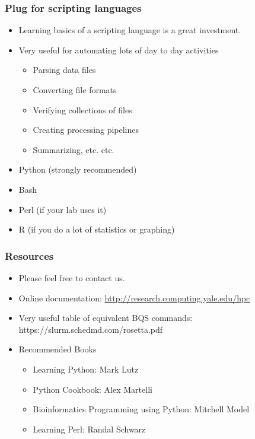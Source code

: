 \documentclass[10pt]{beamer}
\begin{document}
\begin{frame}[fragile]
\frametitle{Plug for scripting languages}

\begin{itemize}
\item Learning basics of a scripting language is a great investment.
\item Very useful for automating lots of day to day activities
\begin{itemize}
\item Parsing data files
\item Converting file formats
\item Verifying collections of files
\item Creating processing pipelines
\item Summarizing, etc. etc.
\end{itemize}
\item Python (strongly recommended)
\item Bash 
\item Perl (if your lab uses it)
\item R (if you do a lot of statistics or graphing)
\end{itemize}

\end{frame}

\begin{frame}[fragile]
\frametitle{Resources}

\begin{itemize}
\item Please feel free to contact us.
\item Online documentation: \url{http://research.computing.yale.edu/hpc}
\item Very useful table of equivalent BQS commands: https://slurm.schedmd.com/rosetta.pdf
\item Recommended Books
\begin{itemize}
\item Learning Python: Mark Lutz
\item Python Cookbook: Alex Martelli
\item Bioinformatics Programming using Python: Mitchell Model
\item Learning Perl: Randal Schwarz
\end{itemize}
\end{itemize}

\end{frame}
\end{document}
